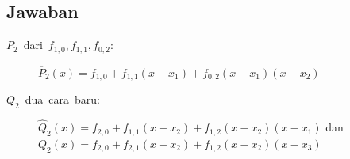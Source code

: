\subsection{Jawaban}
\begin{description}
\item [{$P_{2}$~dari~$f_{1,0},f_{1,1},f_{0,2}$:}] \label{que:p2}$\overline{P}_{2}(x)=f_{1,0}+f_{1,1}(x-x_{1})+f_{0,2}(x-x_{1})(x-x_{2})$
\item [{$Q_{2}$~dua~cara~baru:}] \label{que:q2}$\hat{Q}_{2}(x)=f_{2,0}+f_{1,1}(x-x_{2})+f_{1,2}(x-x_{2})(x-x_{1})$
dan $\overline{Q}_{2}(x)=f_{2,0}+f_{2,1}(x-x_{2})+f_{1,2}(x-x_{2})(x-x_{3})$
\end{description}

